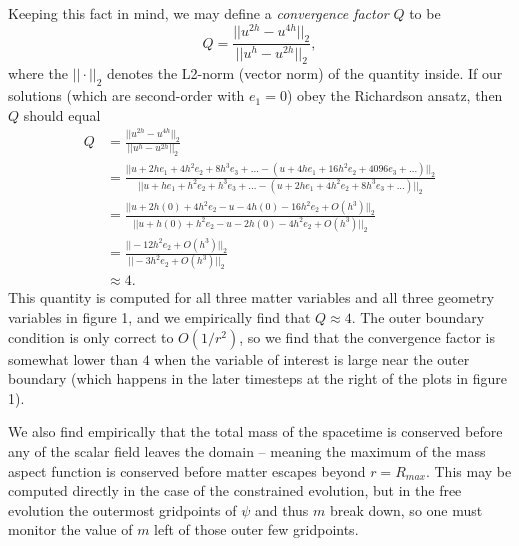 \documentclass[12pt]{article}
\numberwithin{equation}{section}
\begin{document}
Keeping this fact in mind, we may define a \textit{convergence factor} $Q$ to be
\begin{equation}
Q = \frac{|| u^{2h} - u^{4h} ||_2}{|| u^h - u^{2h} ||_2},
\end{equation}
where the $||\cdot||_2$ denotes the L2-norm (vector norm) of the quantity inside.  If our solutions (which are second-order with $e_1 = 0$) obey the Richardson ansatz, then $Q$ should equal
\begin{equation}
\begin{aligned}
Q &= \frac{|| u^{2h} - u^{4h} ||_2}{|| u^h - u^{2h} ||_2} \\
&= \frac{|| u + 2 h e_1 + 4 h^2 e_2 + 8 h^3 e_3 + ... - (u + 4 h e_1 + 16 h^2 e_2 + 4096 e_3 + ...) ||_2}{|| u + h e_1 + h^2 e_2 + h^3 e_3 + ... - (u + 2 h e_1 + 4 h^2 e_2 + 8 h^3 e_3 + ...) ||_2} \\
&= \frac{|| u + 2 h (0) + 4 h^2 e_2 - u - 4 h (0) - 16 h^2 e_2 + O(h^3) ||_2}{|| u + h (0) + h^2 e_2 - u - 2 h (0) - 4 h^2 e_2 + O(h^3) ||_2} \\
&= \frac{|| - 12 h^2 e_2 + O(h^3) ||_2}{|| - 3 h^2 e_2 + O(h^3) ||_2} \\
&\approx 4.
\end{aligned}
\end{equation}
This quantity is computed for all three matter variables and all three geometry variables in figure 1, and we empirically find that $Q \approx 4$.  The outer boundary condition is only correct to $O(1/r^2)$, so we find that the convergence factor is somewhat lower than $4$ when the variable of interest is large near the outer boundary (which happens in the later timesteps at the right of the plots in figure 1).

We also find empirically that the total mass of the spacetime is conserved before any of the scalar field leaves the domain -- meaning the maximum of the mass aspect function is conserved before matter escapes beyond $r = R_{max}$.  This may be computed directly in the case of the constrained evolution, but in the free evolution the outermost gridpoints of $\psi$ and thus $m$ break down, so one must monitor the value of $m$ left of those outer few gridpoints.
\end{document}
